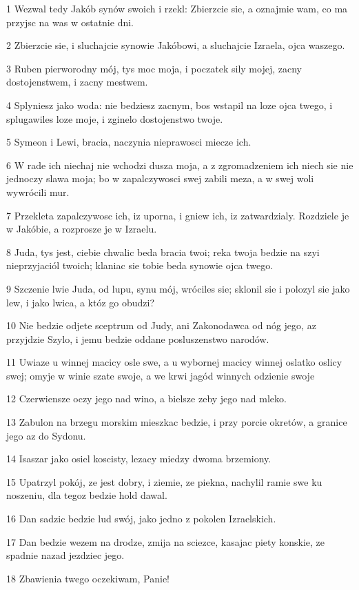 \par 1 Wezwal tedy Jakób synów swoich i rzekl: Zbierzcie sie, a oznajmie wam, co ma przyjsc na was w ostatnie dni.
\par 2 Zbierzcie sie, i sluchajcie synowie Jakóbowi, a sluchajcie Izraela, ojca waszego.
\par 3 Ruben pierworodny mój, tys moc moja, i poczatek sily mojej, zacny dostojenstwem, i zacny mestwem.
\par 4 Splyniesz jako woda: nie bedziesz zacnym, bos wstapil na loze ojca twego, i splugawiles loze moje, i zginelo dostojenstwo twoje.
\par 5 Symeon i Lewi, bracia, naczynia nieprawosci miecze ich.
\par 6 W rade ich niechaj nie wchodzi dusza moja, a z zgromadzeniem ich niech sie nie jednoczy slawa moja; bo w zapalczywosci swej zabili meza, a w swej woli wywrócili mur.
\par 7 Przekleta zapalczywosc ich, iz uporna, i gniew ich, iz zatwardzialy. Rozdziele je w Jakóbie, a rozprosze je w Izraelu.
\par 8 Juda, tys jest, ciebie chwalic beda bracia twoi; reka twoja bedzie na szyi nieprzyjaciól twoich; klaniac sie tobie beda synowie ojca twego.
\par 9 Szczenie lwie Juda, od lupu, synu mój, wróciles sie; sklonil sie i polozyl sie jako lew, i jako lwica, a któz go obudzi?
\par 10 Nie bedzie odjete sceptrum od Judy, ani Zakonodawca od nóg jego, az przyjdzie Szylo, i jemu bedzie oddane posluszenstwo narodów.
\par 11 Uwiaze u winnej macicy osle swe, a u wybornej macicy winnej oslatko oslicy swej; omyje w winie szate swoje, a we krwi jagód winnych odzienie swoje
\par 12 Czerwiensze oczy jego nad wino, a bielsze zeby jego nad mleko.
\par 13 Zabulon na brzegu morskim mieszkac bedzie, i przy porcie okretów, a granice jego az do Sydonu.
\par 14 Isaszar jako osiel koscisty, lezacy miedzy dwoma brzemiony.
\par 15 Upatrzyl pokój, ze jest dobry, i ziemie, ze piekna, nachylil ramie swe ku noszeniu, dla tegoz bedzie hold dawal.
\par 16 Dan sadzic bedzie lud swój, jako jedno z pokolen Izraelskich.
\par 17 Dan bedzie wezem na drodze, zmija na sciezce, kasajac piety konskie, ze spadnie nazad jezdziec jego.
\par 18 Zbawienia twego oczekiwam, Panie!
